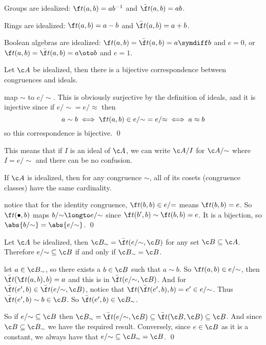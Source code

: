 \edefn

\blist
    \item Groups are idealized: $\f t(a,b)=ab^{-1}$ and $\bar{\f t}(a,b)=ab$.
    \item Rings are idealized: $\f t(a,b)=a-b$ and $\bar{\f t}(a,b)=a+b$.
    \item Boolean algebras are idealized: $\f t(a,b)=\bar{\f t}(a,b)=a\symdiff b$ and $e=0$, or $\f t(a,b)=\bar{\f t}(a,b)=a\oto b$ and $e=1$.
\elist

\bthrm

    Let $\c A$ be idealized, then there is a bijective correspondence between congruences and ideals.

\ethrm

\Proof map $\sim$ to $e/{\sim}$.
This is obviously surjective by the definition of ideals, and it is injective since if $e/{\sim}=e/{\approx}$ then
$$ a\sim b \iff \f t(a,b)\in e/{\sim} = e/{\approx} \iff a\approx b $$
so this correspondence is bijective.
\qed

This means that if $I$ is an ideal of $\c A$, we can write $\c A/I$ for $\c A/{\sim}$ where $I=e/{\sim}$ and there can be no confusion.

\bprop

    If $\c A$ is idealized, then for any congruence $\sim$, all of its cosets (congruence classes) have the same cardinality.

\eprop

\Proof notice that for the identity congruence, $\f t(b,b)\in e/{=}$ means $\f t(b,b)=e$.
So $\f t(\bullet,b)$ maps $b/{\sim}\longto e/{\sim}$ since $\f t(b',b)\sim\f t(b,b)=e$.
It is a bijection, so $\abs{b/{\sim}}=\abs{e/{\sim}}$.
\qed

\bthrm

    Let $\c A$ be idealized, then $\c B_\sim=\bar{\f t}(e/{\sim},\c B)$ for any set $\c B\subseteq\c A$.
    Therefore $e/{\sim}\subseteq\c B$ if and only if $\c B_\sim=\c B$.

\ethrm

\Proof let $a\in\c B_\sim$, so there exists a $b\in\c B$ such that $a\sim b$.
So $\f t(a,b)\in e/{\sim}$, then $\bar{\f t}(\f t(a,b),b)=a$ and this is in $\bar{\f t}(e/{\sim},\c B)$.
And for $\bar{\f t}(e',b)\in\bar{\f t}(e/{\sim},\c B)$, notice that $\f t(\bar{\f t}(e',b),b)=e'\in e/{\sim}$.
Thus $\bar{\f t}(e',b)\sim b\in\c B$.
So $\bar{\f t}(e',b)\in\c B_\sim$.

So if $e/{\sim}\subseteq\c B$ then $\c B_\sim=\bar{\f t}(e/{\sim},\c B)\subseteq\bar{\f t}(\c B,\c B)\subseteq\c B$.
And since $\c B\subseteq\c B_\sim$ we have the required result.
Conversely, since $e\in\c B$ as it is a constant, we always have that $e/{\sim}\subseteq\c B_\sim=\c B$.
\qed

